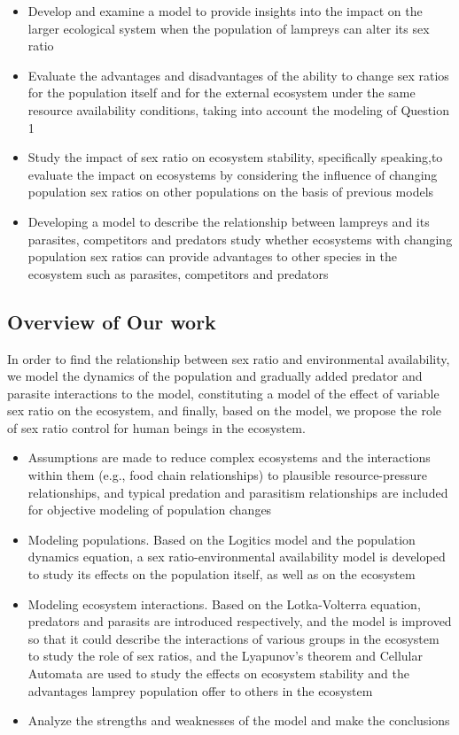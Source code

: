 \documentclass[12pt]{article}  %
\begin{document}
\begin{itemize}
	\item Develop and examine a model to provide insights into the impact on the larger ecological system when the population of lampreys can alter its sex ratio
	\item Evaluate the advantages and disadvantages of the ability to change sex ratios for the population itself and for the external ecosystem under the same resource availability conditions, taking into account the modeling of Question 1
	\item Study the impact of sex ratio on ecosystem stability, specifically speaking,to evaluate the impact on ecosystems by considering the influence of changing population sex ratios on other populations on the basis of previous models
	\item Developing a model to describe the relationship between lampreys and its parasites, competitors and predators study whether ecosystems with changing population sex ratios can provide advantages to other species in the ecosystem such as parasites, competitors and predators
\end{itemize}

\subsection{Overview of Our work}
In order to find the relationship between sex ratio and environmental availability, we model the dynamics of the population and gradually added predator and parasite interactions to the model, constituting a model of the effect of variable sex ratio on the ecosystem, and finally, based on the model, we propose the role of sex ratio control for human beings in the ecosystem.

\begin{itemize}
	\item Assumptions are made to reduce complex ecosystems and the interactions within them (e.g., food chain relationships) to plausible resource-pressure relationships, and typical predation and parasitism relationships are included for objective modeling of population changes
	\item Modeling populations. Based on the Logitics model and the population dynamics equation, a sex ratio-environmental availability model is developed to study its effects on the population itself, as well as on the ecosystem
	\item Modeling ecosystem interactions. Based on the Lotka-Volterra equation, predators and parasits are introduced respectively, and the model is improved so that it could describe the interactions of various groups in the ecosystem to study the role of sex ratios, and the Lyapunov’s theorem and Cellular Automata are used to study
	the effects on ecosystem stability\cite{5} and the advantages lamprey population offer to others in the ecosystem
	\item Analyze the strengths and weaknesses of the model and make the conclusions
\end{itemize}
\end{document}

